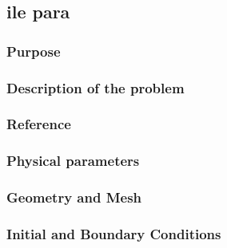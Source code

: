 \subsection{ile para}
%

%    
\subsubsection{Purpose}
%

%
\subsubsection{Description of the problem}
%

%    
%
\subsubsection{Reference}
%

%
%
\subsubsection{Physical parameters}
%

%
%
\subsubsection{Geometry and Mesh}
%

%
%
\subsubsection{Initial and Boundary Conditions}
%

%
%
